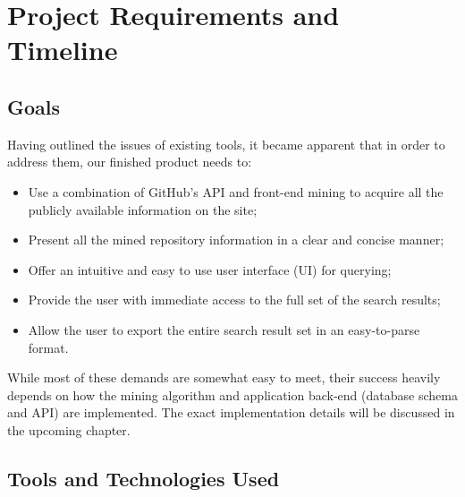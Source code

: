 \chapter{Project Requirements and Timeline}\label{ch:3}

\section{Goals}

Having outlined the issues of existing tools, it became apparent that in order to address them, our finished product needs to:

\begin{itemize}
    \item Use a combination of GitHub's API and front-end mining to acquire all the publicly available information on the site;
    \item Present all the mined repository information in a clear and concise manner;
    \item Offer an intuitive and easy to use user interface (UI) for querying;
    \item Provide the user with immediate access to the full set of the search results;
    \item Allow the user to export the entire search result set in an easy-to-parse format.
\end{itemize}

While most of these demands are somewhat easy to meet, their success heavily depends on how the mining algorithm and application back-end (database schema and API) are implemented.
The exact implementation details will be discussed in the upcoming chapter.

\section{Tools and Technologies Used}

